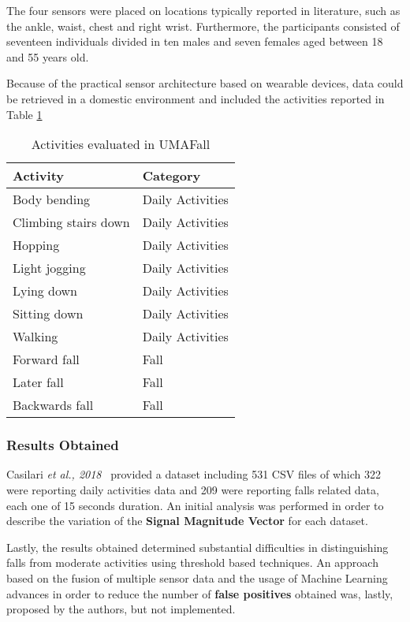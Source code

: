 The four sensors were placed on locations typically reported in literature, such as the ankle, waist, chest and right wrist. Furthermore, the participants consisted of seventeen individuals divided in ten males and seven females aged between 18 and 55 years old.

Because of the practical sensor architecture based on wearable devices, data could be retrieved in a domestic environment and included the activities reported in Table \ref{toc:umafall}

\begin{table}[H]
\centering
\begin{tabular}{ll}
    \hline
    Activity                & Category \\
    \hline
    Body bending            & Daily Activities \\
    Climbing stairs down    & Daily Activities \\
    Hopping                 & Daily Activities \\
    Light jogging           & Daily Activities \\
    Lying down              & Daily Activities \\
    Sitting down            & Daily Activities \\
    Walking                 & Daily Activities \\
    Forward fall            & Fall \\
    Later fall              & Fall \\
    Backwards fall          & Fall \\
    \hline
\end{tabular}
\caption{Activities evaluated in UMAFall}
\label{toc:umafall}
\end{table}

\subsubsection{Results Obtained}\label{subsubsec:umafall-results}

Casilari \textit{et al., 2018}~\cite{umafall} provided a dataset including 531 CSV files of which 322 were reporting daily activities data and 209 were reporting falls related data, each one of 15 seconds duration. An initial analysis was performed in order to describe the variation of the \textbf{Signal Magnitude Vector} for each dataset.

Lastly, the results obtained determined substantial difficulties in distinguishing falls from moderate activities using threshold based techniques. An approach based on the fusion of multiple sensor data and the usage of Machine Learning advances in order to reduce the number of \textbf{false positives} obtained was, lastly, proposed by the authors, but not implemented.

